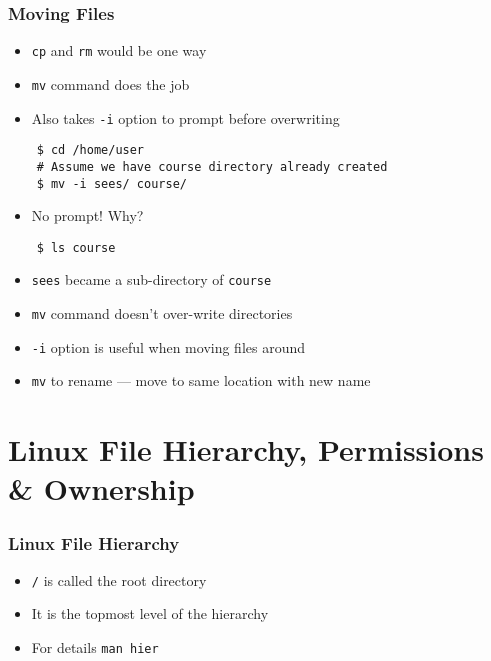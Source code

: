 \documentclass[12pt,compress]{beamer}
\begin{document}
\begin{frame}[fragile]
  \frametitle{Moving Files}
  \begin{itemize}
  \item \texttt{cp} and \texttt{rm} would be one way
  \item \texttt{mv} command does the job
  \item Also takes \texttt{-i} option to prompt before overwriting
  \end{itemize}

  \begin{lstlisting}
    $ cd /home/user
    # Assume we have course directory already created
    $ mv -i sees/ course/
  \end{lstlisting}
  \begin{itemize}
  \item No prompt! Why?
  \end{itemize}
  \begin{lstlisting}
    $ ls course
  \end{lstlisting} %
  \begin{itemize}
  \item \texttt{sees} became a sub-directory of \texttt{course} 
  \item \texttt{mv} command doesn't over-write directories
  \item \texttt{-i} option is useful when moving files around
  \item \texttt{mv} to rename --- move to same location with new name
  \end{itemize}
\end{frame}

\section{Linux File Hierarchy, Permissions \& Ownership}
\begin{frame}
  \frametitle{Linux File Hierarchy}
  \begin{itemize}
  \item \texttt{/} is called the root directory
  \item It is the topmost level of the hierarchy
  \item For details \texttt{man hier}
  \end{itemize}
\end{frame}
\end{document}
